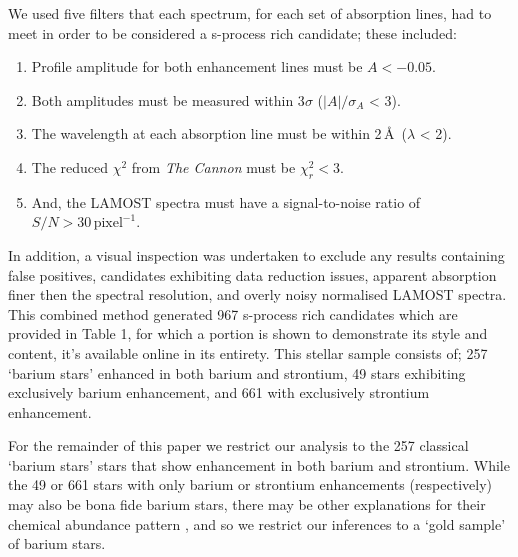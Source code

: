 \documentclass[a4paper,fleqn,usenatbib]{mnras}
\begin{document}
We used five filters that each spectrum, for each set of absorption lines, had to meet in order to be considered a s-process rich candidate; these included:


\renewcommand\labelenumi{(\roman{enumi})}
\renewcommand\theenumi\labelenumi

\begin{enumerate} 
\item Profile amplitude for both enhancement lines must be $A < -0.05$.
\item Both amplitudes must be measured within 3$\sigma$ ($|A|/\sigma _A$ < 3).
\item The wavelength at each absorption line must be within 2\,\AA\ ($\lambda$ < 2).
\item The reduced $\chi^2$ from \emph{The Cannon} must be $\chi_r^2 < 3$.
\item And, the LAMOST spectra must have a signal-to-noise ratio of $S/N > 30\,\textrm{pixel}^{-1}$.
\end{enumerate}
In addition, a visual inspection was undertaken to exclude any results containing false positives, candidates exhibiting data reduction issues, apparent absorption finer then the spectral resolution, and overly noisy normalised LAMOST spectra. This combined method generated 967 s-process rich candidates which are provided in Table 1, for which a portion is shown to demonstrate its style and content, it's available online in its entirety. This stellar sample consists of; 257 `barium stars' enhanced in both barium and strontium, 49 stars exhibiting exclusively barium enhancement, and 661 with exclusively strontium enhancement. 

For the remainder of this paper we restrict our analysis to the 257 classical `barium stars' stars that show enhancement in both barium and strontium. While the 49 or 661 stars with only barium or strontium enhancements (respectively) may also be bona fide barium stars, there may be other explanations for their chemical abundance pattern \citep[e.g.,][]{maiorca2011}, and so we restrict our inferences to a `gold sample' of barium stars. 
\end{document}

